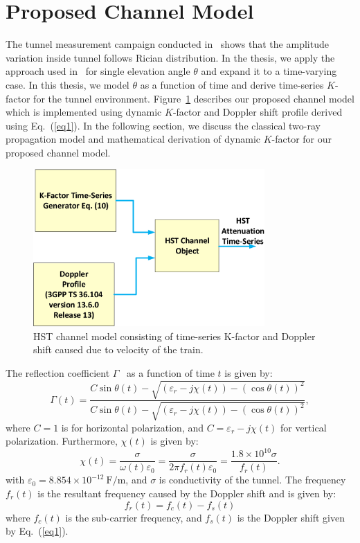 \section{Proposed Channel Model}

The tunnel measurement campaign conducted in~\cite{inplter8} shows that the amplitude variation inside tunnel follows Rician distribution. In the thesis, we apply the approach used in~\cite{inlter15} for single elevation angle $\theta$ and expand it to a time-varying case. In this thesis, we model $\theta$ as a function of time and derive time-series $K$-factor for the tunnel environment. Figure~\ref{subblock} describes our proposed channel model which is implemented using dynamic $K$-factor and Doppler shift profile derived using Eq.~(\ref{eq1}).  In the following section, we discuss the classical two-ray propagation model and mathematical derivation of dynamic $K$-factor for our proposed channel model.

\begin{figure}[!ht]
\centering
\includegraphics[width=\textwidth,height=6cm,keepaspectratio]{images/Gill/lte_figs/subblock.eps} 
\caption{HST channel model consisting of time-series K-factor and Doppler shift caused due to velocity of the train.}
\label{subblock}
\end{figure}

The reflection coefficient $\Gamma$~\cite{booklter16} as a function of time $t$ is given by:
\begin{equation}
\Gamma(t) = \dfrac{C\sin\theta(t)-\sqrt{(\varepsilon_r-j\chi(t))-(\cos\theta(t))^2}}{C\sin\theta(t)-\sqrt{(\varepsilon_r-j\chi(t))-(\cos\theta(t))^2}},
\end{equation}
where $C = 1$ is for horizontal polarization, and $C = \varepsilon_r-j\chi(t)$ for vertical polarization. Furthermore, $\chi(t)$ is given by:
\begin{equation}
\chi(t) = \dfrac{\sigma}{\omega(t)\varepsilon_0} = \dfrac{\sigma}{2\pi f_r(t) \varepsilon_0} = \dfrac{1.8\times 10^{10}\sigma}{f_r(t)}.
\end{equation}
with $\varepsilon_0 = 8.854\times 10^{-12}~\textrm{F/m}$, and $\sigma$ is conductivity of the tunnel. The frequency $f_r(t)$ is the resultant frequency caused by the Doppler shift and is given by:
\begin{equation}
f_r(t) = f_c(t)-f_s(t)
\end{equation}
where $f_c(t)$ is the sub-carrier frequency, and $f_s(t)$ is the Doppler shift given by Eq.~(\ref{eq1}).

